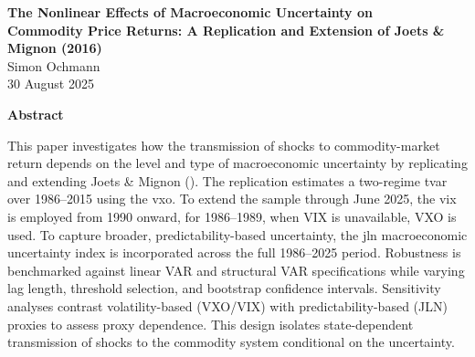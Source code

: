 \documentclass[
  11pt,
]{article}
\author{}
\date{\vspace{-2.5em}}
\begin{document}
\begin{titlepage}
\thispagestyle{empty}
\begin{center}
\vspace*{2cm}
{\LARGE \textbf{The Nonlinear Effects of Macroeconomic Uncertainty on\\
Commodity Price Returns: A Replication and Extension of Joets \& Mignon (2016)}}\\[2cm]

{\large Simon Ochmann}\\[1.5cm]

30 August 2025
\end{center}
\end{titlepage}

\setcounter{page}{2}

\begin{center}\bfseries Abstract\end{center}

\noindent
This paper investigates how the transmission of shocks to commodity-market return depends on the level and type of macroeconomic uncertainty by replicating and extending Joets \& Mignon (). The replication estimates a two-regime \ac{tvar} over 1986--2015 using the \ac{vxo}. To extend the sample through June 2025, the \ac{vix} is employed from 1990 onward, for 1986--1989, when VIX is unavailable, VXO is used. To capture broader, predictability-based uncertainty, the \ac{jln} macroeconomic uncertainty index is incorporated across the full 1986--2025 period. Robustness is benchmarked against linear VAR and structural VAR specifications while varying lag length, threshold selection, and bootstrap confidence intervals. Sensitivity analyses contrast volatility-based (VXO/VIX) with predictability-based (JLN) proxies to assess proxy dependence. This design isolates state-dependent transmission of shocks to the commodity system conditional on the uncertainty.

\clearpage

{}
\tableofcontents
\clearpage

{}
\listoffigures
\clearpage

{}
\listoftables
\clearpage

{}
\small
\printacronyms[
  name=List of Symbols,
  include=symbols,
  heading=section*,
  display=all,
  pages={display=first, fill=\dotfill, name=false, seq/use=false}
]
\clearpage
\end{document}

